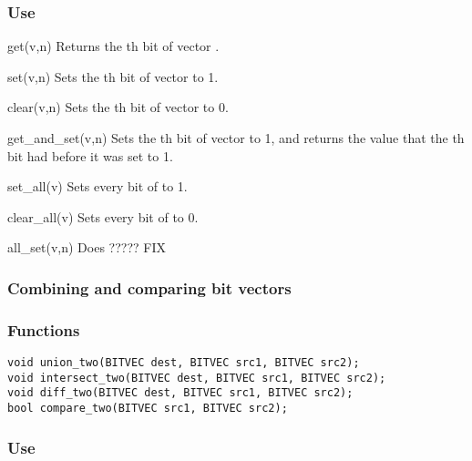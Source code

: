 \subsubsection*{Use}

\begin{defun}{get}{(v,n)}
Returns the th bit of vector .
\end{defun}

\begin{defun}{set}{(v,n)}
Sets the th bit of vector  to 1.
\end{defun}

\begin{defun}{clear}{(v,n)}
Sets the th bit of vector  to 0.
\end{defun}

\begin{defun}{get_and_set}{(v,n)}
Sets the th bit of vector  to 1, and returns the value
that the th bit had before it was set to 1.
\end{defun}

\begin{defun}{set_all}{(v)}
Sets every bit of  to 1.
\end{defun}

\begin{defun}{clear_all}{(v)}
Sets every bit of  to 0.
\end{defun}

\begin{defun}{all_set}{(v,n)}
Does ?????  FIX
\end{defun}

\subsubsection*{Combining and comparing bit vectors}

\subsubsection*{Functions}
\begin{verbatim}
void union_two(BITVEC dest, BITVEC src1, BITVEC src2);
void intersect_two(BITVEC dest, BITVEC src1, BITVEC src2);
void diff_two(BITVEC dest, BITVEC src1, BITVEC src2);
bool compare_two(BITVEC src1, BITVEC src2);
\end{verbatim}

\subsubsection*{Use}

